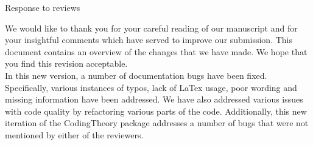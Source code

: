 \documentclass[12pt]{amsart}
\theoremstyle{plain}
\begin{document}
\begin{center}
Response to reviews
\end{center}
We would like to thank you for your careful reading of our manuscript and for your insightful comments which have served to improve our submission. This document contains an overview of the changes that we have made. We hope that you find this revision acceptable.
\\

In this new version, a number of documentation bugs have been fixed. Specifically, various instances of typos, lack of LaTex usage, poor wording and missing information have been addressed. We have also addressed various issues with code quality by refactoring various parts of the code. Additionally, this new iteration of the {\ttfamily CodingTheory} package addresses a number of bugs that were not mentioned by either of the reviewers. 
\\
\end{document}
